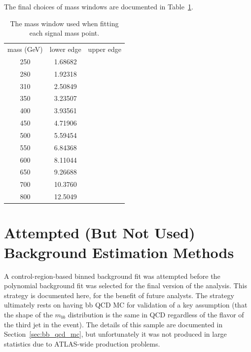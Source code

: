 The final choices of mass windows are documented in Table~\ref{tab:mass_windows}.

\begin{table}
   \caption{The mass window used when fitting each signal mass point. \label{tab:mass_windows} }
    \begin{tabular}{ c c c }
    mass (GeV) & lower edge & upper edge \\
    250        & 1.68682  & \\
    280        & 1.92318 & \\
    310        & 2.50849 & \\
    350        & 3.23507 & \\
    400        & 3.93561 & \\
    450        & 4.71906 & \\
    500        & 5.59454 & \\
    550        & 6.84368 & \\
    600        & 8.11044 & \\
    650        & 9.26688 & \\
    700        & 10.3760 & \\
    800        & 12.5049 & \\
    \end{tabular}
\end{table}









\section{Attempted (But Not Used) Background Estimation Methods}
 
A control-region-based binned background fit was attempted before the polynomial background fit was selected
for the final version of the analysis.  This strategy is documented here, for the
benefit of future analysts.  The strategy ultimately rests on having bb QCD MC for validation
of a key assumption (that the shape of the $m_{bb}$ distribution is the same in QCD 
regardless of the flavor of the third jet in the event).  The details of this sample
are documented in Section~\ref{sec:bb_qcd_mc}, but unfortunately it was not produced in
large statistics due to ATLAS-wide production problems.   


